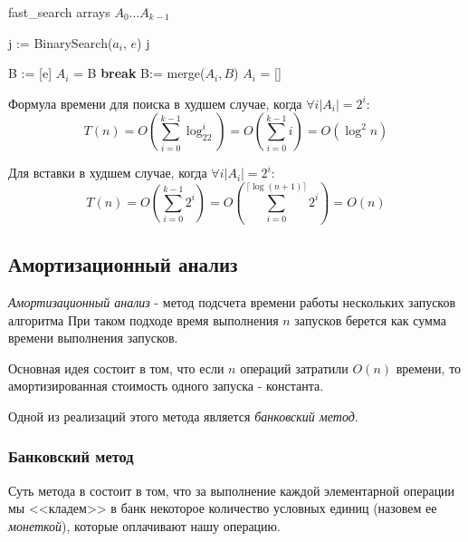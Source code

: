 \documentclass[../main.tex]{subfiles}
\begin{document}
	\begin{struct}{fast\_search}
		\State arrays $A_0 \ldots A_{k - 1}$
		
				\State j := BinarySearch($a_i$, $e$)
				\State \Return j
			\EndFor 	
		\EndFunction
		
			\State B := [e]
					\State $A_i$ = B
					\State \textbf{break}
				\Else
					\State B:= merge($A_i, B$)
					\State $A_i$ = []
				\EndIf			
			\EndFor
		\EndFunction
	\end{struct}
	
	\begin{time}
		Формула времени для поиска в худшем случае, когда $\forall i |A_i| = 2^i$:
		\[
		T(n) = O\left( \sum_{i = 0}^{k - 1} \log_22^i \right) = O\left( \sum_{i = 0} ^ {k - 1} i \right) = O(\log^2n)
		\]
	\end{time}
	
	Для вставки в худшем случае, когда $\forall i |A_i| = 2^i$:
	\[
	T(n) = O\left( \sum_{i = 0}^{k - 1} 2^i \right) = O\left( \sum_{i = 0}^{\lceil \log (n + 1)\rceil} 2^i\right) = O(n)
	\]
	
	\subsection{Амортизационный анализ}
	
	\begin{definition}
		\textit{Амортизационный анализ} - метод подсчета времени работы нескольких запусков алгоритма При таком подходе время выполнения $n$ запусков берется как сумма времени выполнения запусков. %
	\end{definition}
	
	Основная идея состоит в том, что если $n$ операций затратили $O(n)$ времени, то амортизированная стоимость одного запуска - константа.
		
	
	Одной из реализаций этого метода является \textit{банковский метод}.
	
	\subsubsection{Банковский метод}
	
	Суть метода в состоит в том, что за выполнение каждой элементарной операции мы <<кладем>> в банк некоторое количество условных единиц (назовем ее \textit{монеткой}), которые оплачивают нашу операцию. 
	
\end{document}

